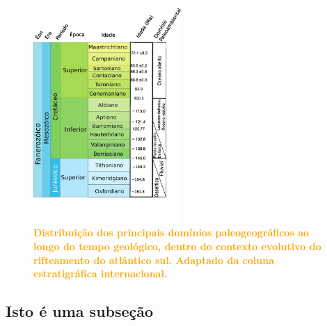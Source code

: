 \documentclass[11pt]{article}
\begin{document}
\lipsum[5]

    \begin{figure}[H]
    \centering
      \includegraphics[width=0.5\textwidth]{figures/paleocrono.jpg}
       \centering
	    \caption{\textcolor{Orange}{\textbf{Distribuição dos principais domínios paleogeográficos ao longo do tempo geológico, dentro do contexto evolutivo do rifteamento do atlântico sul. Adaptado da coluna estratigráfica internacional.}}}
	    \label{fig1}
    \end{figure}


\lipsum[5]

\subsection{Isto é uma subseção}
\lipsum[10]



\newpage
 
\end{document}

